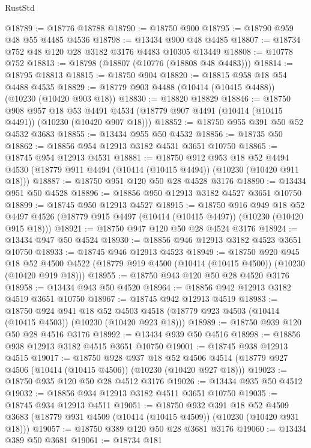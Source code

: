 \begin{lexlean}{RustStd}
\begin{coremodule}
@18789 := @18776 @18788
@18790 := @18750 @900
@18795 := @18790 @959 @48 @55 @4485 @4536
@18798 := @13434 @900 @48 @4485
@18807 := @18734 @752 @48 @120 @28 @3182 @3176 @4483 @10305 @13449
@18808 := @10778 @752
@18813 := @18798 (@18807 (@10776 (@18808 @48 @4483)))
@18814 := @18795 @18813
@18815 := @18750 @904
@18820 := @18815 @958 @18 @54 @4488 @4535
@18829 := @18779 @903 @4488 (@10414 (@10415 @4488)) (@10230 (@10420 @903 @18))
@18830 := @18820 @18829
@18846 := @18750
    @908
    @957
    @18
    @53
    @4491
    @4534
    (@18779 @907 @4491 (@10414 (@10415 @4491)) (@10230 (@10420 @907 @18)))
@18852 := @18750 @955 @391 @50 @52 @4532 @3683
@18855 := @13434 @955 @50 @4532
@18856 := @18735 @50
@18862 := @18856 @954 @12913 @3182 @4531 @3651 @10750
@18865 := @18745 @954 @12913 @4531
@18881 := @18750
    @912
    @953
    @18
    @52
    @4494
    @4530
    (@18779 @911 @4494 (@10414 (@10415 @4494)) (@10230 (@10420 @911 @18)))
@18887 := @18750 @951 @120 @50 @28 @4528 @3176
@18890 := @13434 @951 @50 @4528
@18896 := @18856 @950 @12913 @3182 @4527 @3651 @10750
@18899 := @18745 @950 @12913 @4527
@18915 := @18750
    @916
    @949
    @18
    @52
    @4497
    @4526
    (@18779 @915 @4497 (@10414 (@10415 @4497)) (@10230 (@10420 @915 @18)))
@18921 := @18750 @947 @120 @50 @28 @4524 @3176
@18924 := @13434 @947 @50 @4524
@18930 := @18856 @946 @12913 @3182 @4523 @3651 @10750
@18933 := @18745 @946 @12913 @4523
@18949 := @18750
    @920
    @945
    @18
    @52
    @4500
    @4522
    (@18779 @919 @4500 (@10414 (@10415 @4500)) (@10230 (@10420 @919 @18)))
@18955 := @18750 @943 @120 @50 @28 @4520 @3176
@18958 := @13434 @943 @50 @4520
@18964 := @18856 @942 @12913 @3182 @4519 @3651 @10750
@18967 := @18745 @942 @12913 @4519
@18983 := @18750
    @924
    @941
    @18
    @52
    @4503
    @4518
    (@18779 @923 @4503 (@10414 (@10415 @4503)) (@10230 (@10420 @923 @18)))
@18989 := @18750 @939 @120 @50 @28 @4516 @3176
@18992 := @13434 @939 @50 @4516
@18998 := @18856 @938 @12913 @3182 @4515 @3651 @10750
@19001 := @18745 @938 @12913 @4515
@19017 := @18750
    @928
    @937
    @18
    @52
    @4506
    @4514
    (@18779 @927 @4506 (@10414 (@10415 @4506)) (@10230 (@10420 @927 @18)))
@19023 := @18750 @935 @120 @50 @28 @4512 @3176
@19026 := @13434 @935 @50 @4512
@19032 := @18856 @934 @12913 @3182 @4511 @3651 @10750
@19035 := @18745 @934 @12913 @4511
@19051 := @18750
    @932
    @391
    @18
    @52
    @4509
    @3683
    (@18779 @931 @4509 (@10414 (@10415 @4509)) (@10230 (@10420 @931 @18)))
@19057 := @18750 @389 @120 @50 @28 @3681 @3176
@19060 := @13434 @389 @50 @3681
@19061 := @18734 @181

\end{coremodule}
\end{lexlean}
